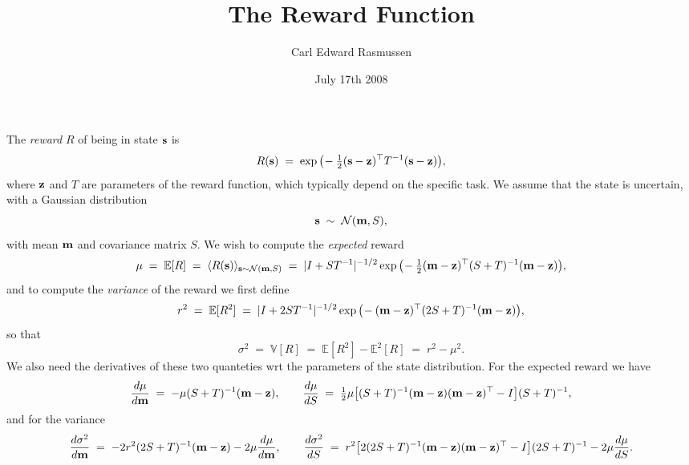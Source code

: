 \documentclass{article}
\title{The Reward Function}
\author{Carl Edward Rasmussen}
\date{July 17th 2008}
\newcommand{\bfm}{{\bf m}}
\newcommand{\bfs}{{\bf s}}
\newcommand{\bfz}{{\bf z}}
\newcommand{\E}{{\mathbb E}}
\newcommand{\V}{{\mathbb V}}
\begin{document}
\maketitle

The \emph{reward} $R$ of being in state $\bfs$ is 
\[
R(\bfs)\;=\;\exp\big(\!-\tfrac{1}{2}(\bfs-\bfz)^\top T^{-1}(\bfs-\bfz)\big),
\]
where $\bfz$ and $T$ are parameters of the reward function, which
typically depend on the specific task. We assume that the state is
uncertain, with a Gaussian distribution
\[
\bfs\;\sim\;{\cal N}(\bfm, S),
\]
with mean $\bfm$ and covariance matrix $S$. We wish to compute the
\emph{expected} reward
\[
\mu\;=\;\E[R]\;=\;\langle R(\bfs)\rangle_{\bfs\sim{\cal N}(\bfm,S)}\;=\;|I+ST^{-1}|^{-1/2}
\exp\big(\!-\tfrac{1}{2}(\bfm-\bfz)^\top (S+T)^{-1}(\bfm-\bfz)\big),
\]
and to compute the \emph{variance} of the reward we first define
\[
r^2\;=\;\E[R^2]\;=\;|I+2ST^{-1}|^{-1/2}
\exp\big(\!-(\bfm-\bfz)^\top (2S+T)^{-1}(\bfm-\bfz)\big),
\]
so that
\[
\sigma^2\;=\;\V[R]\;=\;\E[R^2]-\E^2[R]\;=\;r^2-\mu^2.
\]
We also need the derivatives of these two quanteties wrt the
parameters of the state distribution. For the expected reward we have
\[
\frac{d\mu}{d\bfm}\;=\;-\mu(S+T)^{-1}(\bfm-\bfz),\qquad
\frac{d\mu}{dS}\;=\;\tfrac{1}{2}\mu\big[(S+T)^{-1}(\bfm-\bfz)(\bfm-\bfz)^\top
-I\big](S+T)^{-1},
\]
and for the variance
\[
\frac{d\sigma^2}{d\bfm}\;=\;-2r^2(2S+T)^{-1}(\bfm-\bfz)-2\mu\frac{d\mu}{d\bfm},
\qquad\frac{d\sigma^2}{dS}\;=\;r^2\big
[2(2S+T)^{-1}(\bfm-\bfz)(\bfm-\bfz)^\top -I\big](2S+T)^{-1} -2\mu\frac{d\mu}{dS}.
\]
\end{document}
